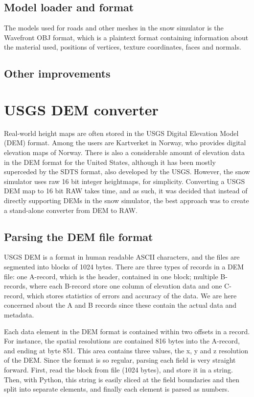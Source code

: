 \subsection{Model loader and format}
The models used for roads and other meshes in the snow simulator is the Wavefront OBJ format, which is a plaintext format containing information about the material used, positions of vertices, texture coordinates, faces and normals. 

\subsection{Other improvements}

\section{USGS DEM converter}
Real-world height maps are often stored in the USGS Digital Elevation Model (DEM) format. Among the users are Kartverket in Norway, who provides digital elevation maps of Norway. There is also a considerable amount of elevation data in the DEM format for the United States, although it has been mostly superceded by the SDTS format, also developed by the USGS\cite{wiki_usgsdem}. However, the snow simulator uses raw 16 bit integer heightmaps, for simplicity. Converting a USGS DEM map to 16 bit RAW takes time, and as such, it was decided that instead of directly supporting DEMs in the snow simulator, the best approach was to create a stand-alone converter from DEM to RAW.


\subsection{Parsing the DEM file format}
USGS DEM is a format in human readable ASCII characters, and the files are segmented into blocks of 1024 bytes. There are three types of records in a DEM file: one A-record, which is the header, contained in one block; multiple B-records, where each B-record store one column of elevation data and one C-record, which stores statistics of errors and accuracy of the data. We are here concerned about the A and B records since these contain the actual data and metadata. 

Each data element in the DEM format is contained within two offsets in a record. For instance, the spatial resolutions are contained 816 bytes into the A-record, and ending at byte 851. This area contains three values, the x, y and z resolution of the DEM. Since the format is so regular, parsing each field is very straight forward. First, read the block from file (1024 bytes), and store it in a string. Then, with Python, this string is easily sliced at the field boundaries and then split into separate elements, and finally each element is parsed as numbers.

